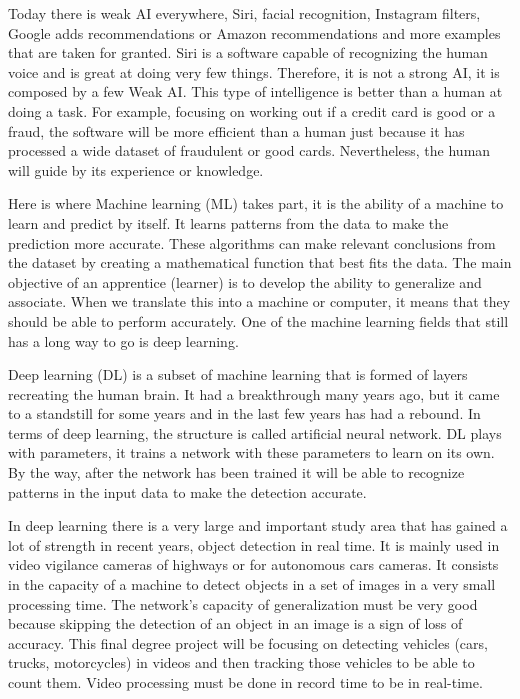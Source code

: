 \begin{sloppypar}
Today  there  is  weak  AI  everywhere,  Siri,  facial  recognition,  Instagram  filters,  Google  adds 
recommendations or Amazon recommendations and more examples that are taken for granted. 
Siri is a software capable of recognizing the human voice and is great at doing very few things. 
Therefore, it is not a strong AI, it is composed by a few Weak AI. This type of intelligence is better 
than a human at doing a task. For example, focusing on working out if a credit card is good or a 
fraud,  the  software  will  be more  efficient  than  a  human  just  because  it  has  processed  a wide 
dataset  of  fraudulent  or  good  cards.  Nevertheless,  the  human  will  guide  by  its  experience  or 
knowledge.
\par 
Here is where Machine learning (ML) takes part, it is the ability of a machine to learn and predict 
by  itself.  It  learns  patterns  from  the  data  to  make  the  prediction  more  accurate.  These 
algorithms can make relevant conclusions from the dataset by creating a mathematical function 
that best fits the data. The main objective of an apprentice (learner) is to develop the ability to 
generalize and associate. When we translate this into a machine or computer, it means that they 
should be able to perform accurately. One of the machine learning fields that still has a long way 
to go is deep learning. 
\par
Deep learning (DL) is a subset of machine learning that is formed of layers recreating the human 
brain. It had a breakthrough many years ago, but it came to a standstill for  some years and in 
the last few years has had a rebound. In terms of deep learning, the structure is called artificial 
neural network. DL plays with parameters, it trains a network with these parameters to learn on 
its own. By the way, after the network has been trained it will be able to recognize patterns in 
the  input  data  to  make  the  detection  accurate.
\par
In deep learning there is a very large and important study area that has gained a lot of strength 
in  recent  years,  object  detection  in  real  time.  It  is  mainly  used  in  video  vigilance  cameras  of 
highways  or  for  autonomous  cars  cameras.  It  consists  in  the  capacity  of  a  machine  to  detect 
objects in a set of images in a very small processing time. The  network’s  capacity  of 
generalization must be very good because skipping the detection of an object in an image is a 
sign  of  loss  of  accuracy.  This  final  degree  project  will  be  focusing  on  detecting  vehicles  (cars, 
trucks, motorcycles) in videos and then tracking those vehicles to be able to count them. Video 
processing must be done in record time to be in real-time. 

\end{sloppypar}

